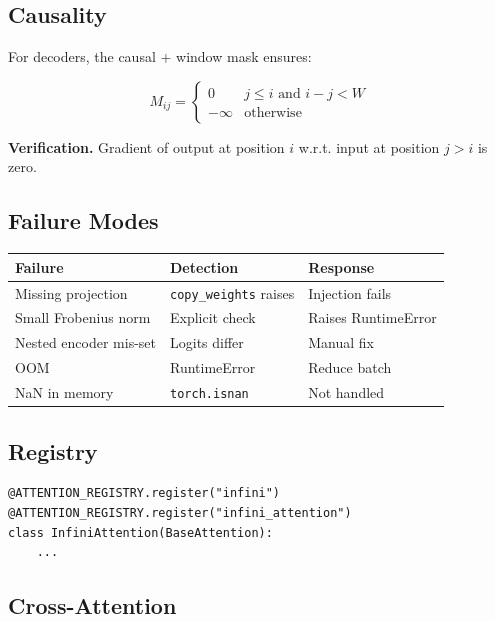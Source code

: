\subsection{Causality}

For decoders, the causal + window mask ensures:

\[
M_{ij} = \begin{cases} 0 & j \leq i \text{ and } i - j < W \\ -\infty & \text{otherwise} \end{cases}
\tag{5.1}
\]

\textbf{Verification.} Gradient of output at position $i$ w.r.t. input at 
position $j > i$ is zero.

\subsection{Failure Modes}

\begin{table}[H]
\centering
\small
\begin{tabular}{lll}
\toprule
\textbf{Failure} & \textbf{Detection} & \textbf{Response} \\
\midrule
Missing projection & \texttt{copy\_weights} raises & Injection fails \\
Small Frobenius norm & Explicit check & Raises RuntimeError \\
Nested encoder mis-set & Logits differ & Manual fix \\
OOM & RuntimeError & Reduce batch \\
NaN in memory & \texttt{torch.isnan} & Not handled \\
\bottomrule
\end{tabular}
\end{table}

\subsection{Registry}

\begin{lstlisting}
@ATTENTION_REGISTRY.register("infini")
@ATTENTION_REGISTRY.register("infini_attention")
class InfiniAttention(BaseAttention):
    ...
\end{lstlisting}

\subsection{Cross-Attention}

